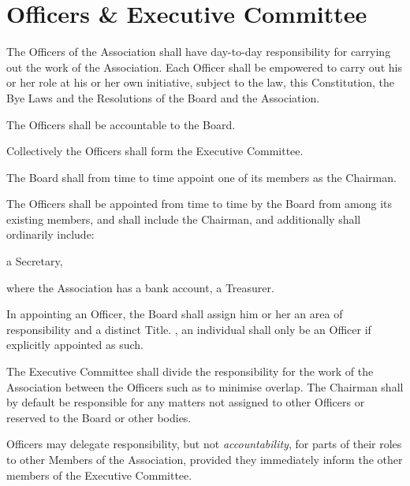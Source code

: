 \documentclass[10pt]{mk-articles-of-association}
\newcommand{\EC}[0]{Board}
\newcommand{\Exec}[0]{\EC{} }
\begin{document}
\section{Officers \& Executive Committee}
  \begin{constenum}
    \item The Officers of the Association shall have day-to-day
      responsibility for carrying out the work of the Association.
      Each Officer shall be empowered to carry out his or her role at
      his or her own initiative, subject to the law, this
      Constitution, the Bye Laws and the Resolutions of the \Exec and
      the Association.

    \item The Officers shall be accountable to the \EC{}.

    \item Collectively the Officers shall form the Executive Committee.

    \item The \Exec shall from time to time appoint one of its members
      as the Chairman.

    \item The Officers shall be appointed from time to time by
      the \Exec from among its existing members, and shall include
      the Chairman, and additionally shall ordinarily include:
      \begin{constenum}
      \item a Secretary, \ITand
      \item where the Association has a bank account, a Treasurer.
      \end{constenum}

    \item In appointing an Officer, the \Exec shall assign him or her
      an area of responsibility and a distinct Title.
      \avoiddoubt, an individual shall only be an Officer if explicitly
      appointed as such.

    \item The Executive Committee shall divide the responsibility for
      the work of the Association between the Officers such as to
      minimise overlap. The Chairman shall by default be responsible for any
      matters not assigned to other Officers or reserved to the \Exec or
      other bodies.

    \item Officers may delegate responsibility, but not
      \textit{accountability}, for parts of their roles to other
      Members of the Association, provided they immediately inform the
      other members of the Executive Committee.


\end{constenum}
\end{document}

